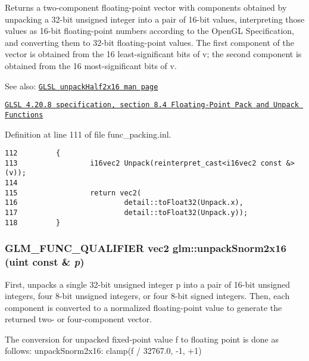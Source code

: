 Returns a two-component floating-point vector with components obtained by unpacking a 32-bit unsigned integer into a pair of 16-bit values, interpreting those values as 16-bit floating-point numbers according to the OpenGL Specification, and converting them to 32-bit floating-point values. The first component of the vector is obtained from the 16 least-significant bits of v; the second component is obtained from the 16 most-significant bits of v.

\begin{Desc}
\item[See also:]\href{http://www.opengl.org/sdk/docs/manglsl/xhtml/unpackHalf2x16.xml}{\tt GLSL unpackHalf2x16 man page} 

\href{http://www.opengl.org/registry/doc/GLSLangSpec.4.20.8.pdf}{\tt GLSL 4.20.8 specification, section 8.4 Floating-Point Pack and Unpack Functions} \end{Desc}


Definition at line 111 of file func\_\-packing.inl.

\begin{Code}\begin{verbatim}112         {
113                 i16vec2 Unpack(reinterpret_cast<i16vec2 const &>(v));
114         
115                 return vec2(
116                         detail::toFloat32(Unpack.x), 
117                         detail::toFloat32(Unpack.y));
118         }
\end{verbatim}
\end{Code}


\hypertarget{group__core__func__packing_ga3f9bd6a71d7bdfab090b9626f2466aa}{
\subsubsection[unpackSnorm2x16]{\setlength{\rightskip}{0pt plus 5cm}GLM\_\-FUNC\_\-QUALIFIER vec2 glm::unpackSnorm2x16 (uint const \& {\em p})}}
\label{group__core__func__packing_ga3f9bd6a71d7bdfab090b9626f2466aa}


First, unpacks a single 32-bit unsigned integer p into a pair of 16-bit unsigned integers, four 8-bit unsigned integers, or four 8-bit signed integers. Then, each component is converted to a normalized floating-point value to generate the returned two- or four-component vector.

The conversion for unpacked fixed-point value f to floating point is done as follows: unpackSnorm2x16: clamp(f / 32767.0, -1, +1)

